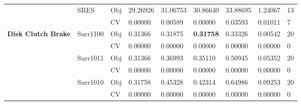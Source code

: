 \begin{table*}[!htb]
\begin{tabular}{lllllllll}
		& SRES                               & Obj                                & 29.26926                           & 31.06753                           & 30.86640                             & 33.88695                            & 1.24067                           & 13               \\
		&                                    & CV                                 & 0.00000                            & 0.00589                            & 0.00000                              & 0.03593                             & 0.01011                           & 7                \\ \hline
		\multirow{16}{*}{\textbf{Disk Clutch Brake}} & Surr1100                           & Obj                                & 0.31366                            & 0.31875                            & \textbf{0.31758}                     & 0.33326                             & 0.00542                           & 20               \\
		&                                    & CV                                 & 0.00000                            & 0.00000                            & 0.00000                              & 0.00000                             & 0.00000                           & 0                \\
		& Surr1011                           & Obj                                & 0.31366                            & 0.36993                            & 0.35110                              & 0.50945                             & 0.05352                           & 20               \\
		&                                    & CV                                 & 0.00000                            & 0.00000                            & 0.00000                              & 0.00000                             & 0.00000                           & 0                \\
		& Surr1010                           & Obj                                & 0.31758                            & 0.45328                            & 0.42314                              & 0.64986                             & 0.09253                           & 20               \\
		&                                    & CV                                 & 0.00000                            & 0.00000                            & 0.00000                              & 0.00000                             & 0.00000                           & 0                \\

\end{tabular}
\end{table*}
